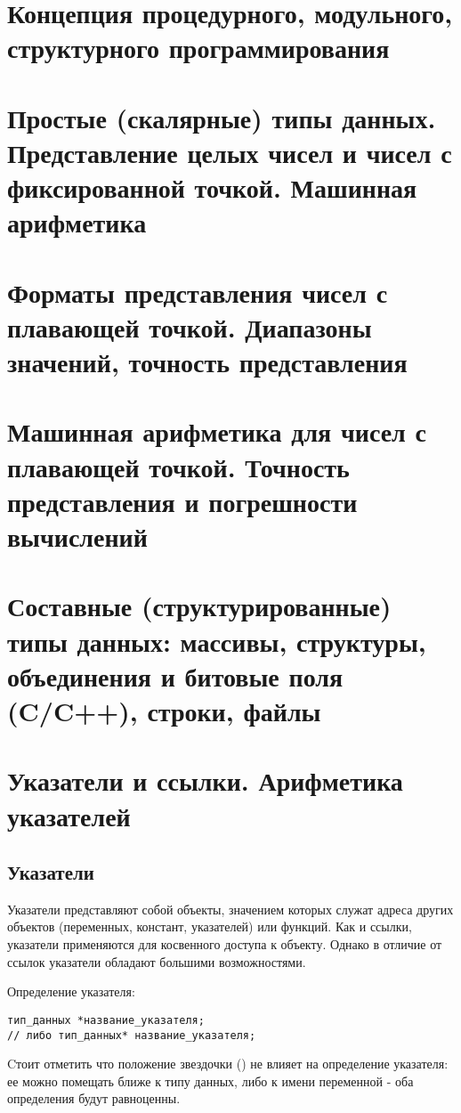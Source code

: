 \section{Концепция процедурного, модульного, структурного программирования}
\section{Простые (скалярные) типы данных. Представление целых чисел и чисел с фиксированной точкой. Машинная арифметика}
\section{Форматы представления чисел с плавающей точкой. Диапазоны значений, точность представления}
\section{Машинная арифметика для чисел с плавающей точкой. Точность представления и погрешности вычислений}
\section{Составные (структурированные) типы данных: массивы, структуры, объединения и битовые поля (C/C++), строки, файлы}
\section{Указатели и ссылки. Арифметика указателей}
\subsection{Указатели}

Указатели представляют собой объекты, значением которых служат адреса других объектов (переменных, констант, указателей) или функций. Как и ссылки, указатели применяются для косвенного доступа к объекту. Однако в отличие от ссылок указатели обладают большими возможностями.

\vspace{\baselineskip}

\noindent Определение указателя:
\begin{verbatim}
тип_данных *название_указателя;
// либо тип_данных* название_указателя;
\end{verbatim}

Cтоит отметить что положение звездочки (\mverb{*}) не влияет на определение указателя: ее можно помещать ближе к типу данных, либо к имени переменной - оба определения будут равноценны.

